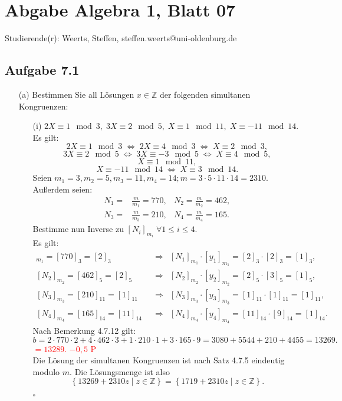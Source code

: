 \documentclass[12pt]{article}
\newcommand{\corr}[1]{\textcolor{red}{#1}}
\newcommand{\QED}{\begin{flushright} $\square$ \end{flushright}}
\newcommand{\df}{\enspace\Longrightarrow\enspace}
\newcommand{\gdw}{\;\Longleftrightarrow\;}
\begin{document}
\section*{Abgabe Algebra 1, Blatt 07}

Studierende(r): Weerts, Steffen, steffen.weerts@uni-oldenburg.de

\subsection*{Aufgabe 7.1}
\begin{enumerate}
	\item[(a)] Bestimmen Sie all Lösungen $x\in\mathbb{Z}$ der folgenden simultanen Kongruenzen:
	\begin{enumerate}
		\item[(i)] $2X\equiv 1\mod 3,\;3X\equiv 2\mod 5,\;X\equiv 1\mod 11,\;X\equiv -11\mod 14$. \\
		Es gilt:
		$$2X\equiv 1\mod 3\gdw 2X\equiv 4\mod 3\gdw X\equiv 2\mod 3,$$
		$$3X\equiv 2\mod 5\gdw 3X\equiv -3\mod 5\gdw X\equiv 4\mod 5,$$
		$$X\equiv 1\mod 11,$$
		$$X\equiv -11\mod 14\gdw X\equiv 3\mod 14.$$
		Seien $m_1=3,m_2=5,m_3=11,m_4=14;m=3\cdot 5\cdot 11\cdot 14=2310$. \\
		Außerdem seien:
		\begin{align*}
			N_1=&\frac{m}{m_1}=770, &N_2=\frac{m}{m_2}=462, \\
			N_3=&\frac{m}{m_3}=210, &N_4=\frac{m}{m_4}=165.
		\end{align*}
		Bestimme nun Inverse zu $[N_i]_{m_i}\;\forall 1\leq i\leq 4$. \\
		Es gilt:
		\begin{align*}
			[N_1]_{m_1}=[770]_3=[2]_3&\df[N_1]_{m_1}\cdot[y_1]_{m_1}=[2]_3\cdot[2]_3=[1]_3, \\
			[N_2]_{m_2}=[462]_5=[2]_5&\df[N_2]_{m_2}\cdot[y_2]_{m_2}=[2]_5\cdot[3]_5=[1]_5, \\
			[N_3]_{m_3}=[210]_{11}=[1]_{11}&\df[N_3]_{m_3}\cdot[y_3]_{m_3}=[1]_{11}\cdot[1]_{11}=[1]_{11}, \\
			[N_4]_{m_4}=[165]_{14}=[11]_{14}&\df[N_4]_{m_4}\cdot[y_4]_{m_4}=[11]_{14}\cdot[9]_{14}=[1]_{14}.
		\end{align*}
		Nach Bemerkung 4.7.12 gilt:
		$$b=2\cdot770\cdot2+4\cdot462\cdot3+1\cdot210\cdot1+3\cdot165\cdot9=3080+5544+210+4455=13269.$$
\corr{$=13289$. $-0,5$ P}\\
		Die Lösung der simultanen Kongruenzen ist nach Satz 4.7.5 eindeutig modulo $m$. Die Lösungsmenge ist also
		$$\left\{13269+2310z\mid z\in\mathbb{Z}\right\}=\left\{1719+2310z\mid z\in\mathbb{Z}\right\}.$$
		\QED
		

\end{enumerate}
\end{enumerate}
\end{document}
